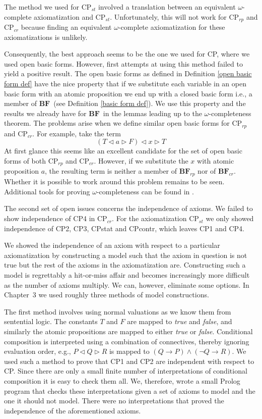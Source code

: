 \documentclass[a4paper,twoside,openright]{report}
\newcommand{\BF}{\ensuremath{\textbf{BF}}}
\newcommand{\lef}{\ensuremath{\triangleleft}}
\newcommand{\rig}{\ensuremath{\triangleright}}
\begin{document}
The method we used for $\text{CP}_{st}$ involved a translation between an equivalent $\omega$-complete axiomatization and $\text{CP}_{st}$. Unfortunately, this will not work for $\text{CP}_{rp}$ and $\text{CP}_{cr}$ because finding an equivalent $\omega$-complete axiomatization for these axiomatizations is unlikely.

Consequently, the best approach seems to be the one we used for CP, where we used open basic forms. However, first attempts at using this method failed to yield a positive result. The open basic forms as defined in Definition \ref{open basic form def} have the nice property that if we substitute each variable in an open basic form with an atomic proposition we end up with a closed basic form i.e., a member of \BF\ (see Definition \ref{basic form def}). We use this property and the results we already have for \BF\ in the lemmas leading up to the $\omega$-completeness theorem. The problems arise when we define similar open basic forms for $\text{CP}_{rp}$ and $\text{CP}_{cr}$. For example, take the term
\[
(T\lef a\rig F)\lef x\rig T
\]
At first glance this seems like an excellent candidate for the set of open basic forms of both $\text{CP}_{rp}$ and $\text{CP}_{cr}$. However, if we substitute the $x$ with atomic proposition $a$, the resulting term is neither a member of $\BF_{rp}$ nor of $\BF_{cr}$. Whether it is possible to work around this problem remains to be seen. Additional tools for proving $\omega$-completeness can be found in \cite{omega}.

The second set of open issues concerns the independence of axioms. We failed to show independence of CP4 in $\text{CP}_{cr}$. For the axiomatization $\text{CP}_{st}$ we only showed independence of CP2, CP3, CPstat and CPcontr, which leaves CP1 and CP4.

We showed the independence of an axiom with respect to a particular axiomatization by constructing a model such that the axiom in question is not true but the rest of the axioms in the axiomatization are. Constructing such a model is regrettably a hit-or-miss affair and becomes increasingly more difficult as the number of axioms multiply. We can, however, eliminate some options. In Chapter~3 we used roughly three methods of model constructions. 

The first method involves using normal valuations as we know them from sentential logic. The constants $T$ and $F$ are mapped to \emph{true} and \emph{false}, and similarly the atomic propositions are mapped to either \emph{true} or \emph{false}. Conditional composition is interpreted using a combination of connectives, thereby ignoring evaluation order, e.g., $P\lef Q\rig R$ is mapped to $(Q\to P)\wedge(\neg Q\to R)$. We used such a method to prove that CP1 and CP2 are independent with respect to CP. Since there are only a small finite number of interpretations of conditional composition it is easy to check them all. We, therefore, wrote a small Prolog program that checks these interpretations given a set of axioms to model and the one it should not model. There were no interpretations that proved the independence of the aforementioned axioms.
\end{document}
